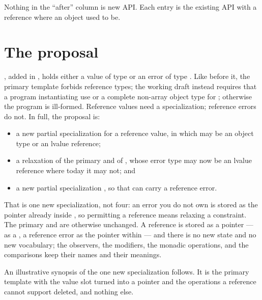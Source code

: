 \documentclass[a4paper,10pt,oneside,openany,final,article]{memoir}
\begin{document}
Nothing in the ``after'' column is new API. Each entry is the existing
 API with a reference where an object used to be.

\chapter{The proposal}

 \cite{P0323R12}, added in \CppXXIII{}, holds either
a value of type  or an error of type . Like
 before it, the primary template forbids reference types;
the working draft instead requires that a program instantiating
 use  or a complete non-array object type for
; otherwise the program is ill-formed. Reference values need a
specialization; reference errors do not. In full, the proposal is:

\begin{itemize}
\item a new partial specialization  for a reference
  value, in which  may be an object type or an lvalue reference;
\item a relaxation of the primary  and of
  , whose error type  may now be an lvalue
  reference where today it may not; and
\item a new partial specialization , so that
   can carry a reference error.
\end{itemize}

That is one new  specialization, not four: an error you do not
own is stored as the pointer already inside , so
permitting a reference  means relaxing a constraint. The primary
 and  are otherwise unchanged.
A reference is stored as a pointer ---  as a , a reference
error as the pointer within  --- and there is no new
state and no new vocabulary; the observers, the modifiers, the monadic
operations, and the comparisons keep their names and their meanings.

An illustrative synopsis of the one new specialization follows. It is the
primary template with the value slot turned into a pointer and the operations a
reference cannot support deleted, and nothing else.
\end{document}

